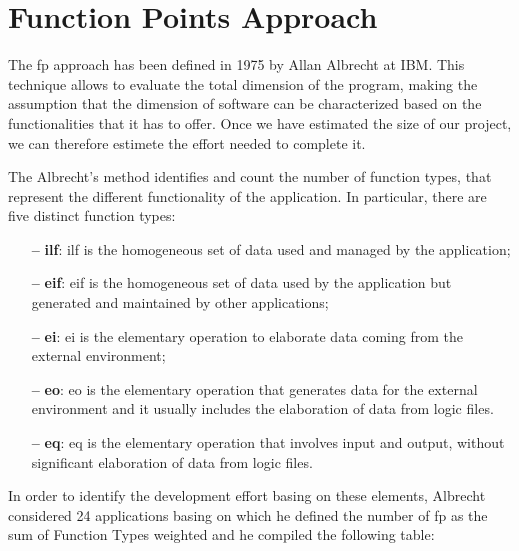 \section{Function Points Approach} \label{sec:functpointappr}


The \acl{fp} approach has been defined in 1975 by Allan Albrecht at IBM. This technique allows to evaluate the total dimension of the program, making the assumption that the dimension of software can be characterized based on the functionalities that it has to offer.
Once we have estimated the size of our project, we can therefore estimete the effort needed to complete it.
\newline

The Albrecht's method identifies and count the number of function types, that represent the different functionality of the application.
In particular, there are five distinct function types:

\begin{itemize}

\item[\textbf{--}] \textbf{\acl{ilf}}: \acs{ilf} is the homogeneous set of data used and managed by the application;

\item[\textbf{--}] \textbf{\acl{eif}}: \acs{eif} is the homogeneous set of data used by the application but generated and maintained by other applications;

\item[\textbf{--}] \textbf{\acl{ei}}: \acs{ei} is the elementary operation to elaborate data coming from the external environment;

\item[\textbf{--}] \textbf{\acl{eo}}: \acs{eo} is the elementary operation that generates data for the external environment and it usually includes the elaboration of data from logic files.

\item[\textbf{--}] \textbf{\acl{eq}}: \acs{eq} is the elementary operation that involves input and output, without significant elaboration of data from logic files.

\end{itemize}

In order to identify the development effort basing on these elements, Albrecht considered 24 applications basing on which he defined the number of \acs{fp} as the sum of Function Types weighted and he compiled the following table:

